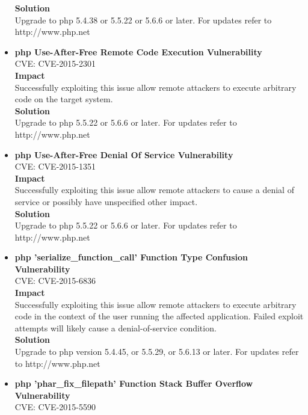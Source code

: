 \begin{itemize}
\textbf{Solution}\\
Upgrade to php 5.4.38 or 5.5.22 or 5.6.6 or later. For updates refer to http://www.php.net\\

\item \textbf{php Use-After-Free Remote Code Execution Vulnerability } \\
CVE: CVE-2015-2301\\

\textbf{Impact} \\
Successfully exploiting this issue allow remote attackers to execute arbitrary code on the target system.\\

\textbf{Solution}\\
Upgrade to php 5.5.22 or 5.6.6 or later. For updates refer to http://www.php.net

\item \textbf{php Use-After-Free Denial Of Service Vulnerability} \\
CVE: CVE-2015-1351\\

\textbf{Impact} \\
Successfully exploiting this issue allow remote attackers to cause a denial of service or possibly have unspecified other impact.\\

\textbf{Solution}\\
Upgrade to php 5.5.22 or 5.6.6 or later. For updates refer to http://www.php.net\\

\item \textbf{php 'serialize\_function\_call' Function Type Confusion Vulnerability} \\
CVE: CVE-2015-6836\\

\textbf{Impact} \\
Successfully exploiting this issue allow remote attackers to execute arbitrary code in the context of the user running the affected application. Failed exploit attempts will likely cause a denial-of-service condition.\\


\textbf{Solution}\\
Upgrade to php version 5.4.45, or 5.5.29, or 5.6.13 or later. For updates refer to http://www.php.net\\

\item \textbf{php 'phar\_fix\_filepath' Function Stack Buffer Overflow Vulnerability} \\
CVE: CVE-2015-5590\\


\end{itemize}
